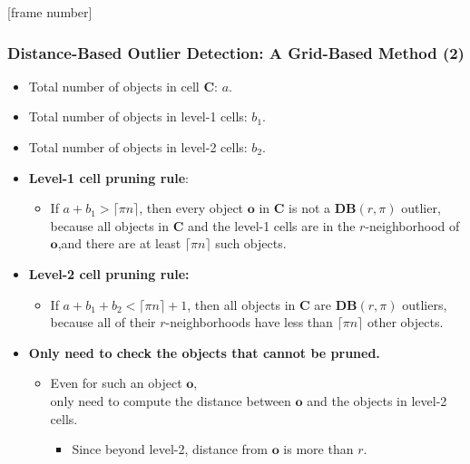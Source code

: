 \documentclass[aspectratio=169,t,xcolor=dvipsnames]{beamer}
\begin{document}
{
  [frame number]
  \begin{frame}
  	\frametitle{Distance-Based Outlier Detection: A Grid-Based Method (2)}
  	\begin{itemize}
  		\item Total number of objects in cell $\mathbf{C}$: $a$.
  		\item Total number of objects in level-1 cells: $b_1$.
  		\item Total number of objects in level-2 cells: $b_2$.
  	\end{itemize}
    \begin{itemize}
    	\item \textbf{Level-1 cell pruning rule}:
    	\begin{itemize}
    		\item If $a + b_1 > \lceil \pi n \rceil$, then every object $\mathbf{o}$ in $\mathbf{C}$ is not a $\mathbf{DB}(r, \pi)$ outlier, because all objects in $\mathbf{C}$ and the level-1 cells are in the $r$-neighborhood of $\mathbf{o}$,and there are at least $\lceil \pi n \rceil$ such objects.
    	\end{itemize}
    	\item \textbf{Level-2 cell pruning rule:}
    	\begin{itemize}
    		\item If $a + b_1 + b_2 < \lceil \pi n \rceil + 1$, then all objects in $\mathbf{C}$ are $\mathbf{DB}(r, \pi)$ outliers, because all of their $r$-neighborhoods have less than $\lceil \pi n \rceil$ other objects.
    	\end{itemize}
    	\item \textbf{Only need to check the objects that cannot be pruned.}
    	\begin{itemize}
    		\item Even for such an object $\mathbf{o}$, \\
        only need to compute the distance between $\mathbf{o}$ and the objects in level-2 cells.
    		      \begin{itemize}
    		      	\item Since beyond level-2, distance from $\mathbf{o}$ is more than $r$.
    		      \end{itemize}
    	\end{itemize}
    \end{itemize}
  \end{frame}
}
\end{document}
